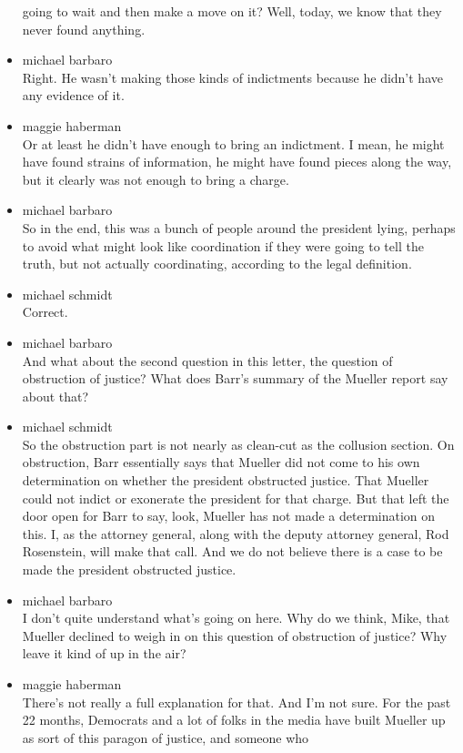 \begin{itemize}
  going to wait and then make a move on it? Well, today, we know that
  they never found anything.
\item
  michael barbaro\\
  Right. He wasn't making those kinds of indictments because he didn't
  have any evidence of it.
\item
  maggie haberman\\
  Or at least he didn't have enough to bring an indictment. I mean, he
  might have found strains of information, he might have found pieces
  along the way, but it clearly was not enough to bring a charge.
\item
  michael barbaro\\
  So in the end, this was a bunch of people around the president lying,
  perhaps to avoid what might look like coordination if they were going
  to tell the truth, but not actually coordinating, according to the
  legal definition.
\item
  michael schmidt\\
  Correct.
\item
  michael barbaro\\
  And what about the second question in this letter, the question of
  obstruction of justice? What does Barr's summary of the Mueller report
  say about that?
\item
  michael schmidt\\
  So the obstruction part is not nearly as clean-cut as the collusion
  section. On obstruction, Barr essentially says that Mueller did not
  come to his own determination on whether the president obstructed
  justice. That Mueller could not indict or exonerate the president for
  that charge. But that left the door open for Barr to say, look,
  Mueller has not made a determination on this. I, as the attorney
  general, along with the deputy attorney general, Rod Rosenstein, will
  make that call. And we do not believe there is a case to be made the
  president obstructed justice.
\item
  michael barbaro\\
  I don't quite understand what's going on here. Why do we think, Mike,
  that Mueller declined to weigh in on this question of obstruction of
  justice? Why leave it kind of up in the air?
\item
  maggie haberman\\
  There's not really a full explanation for that. And I'm not sure. For
  the past 22 months, Democrats and a lot of folks in the media have
  built Mueller up as sort of this paragon of justice, and someone who

\end{itemize}
